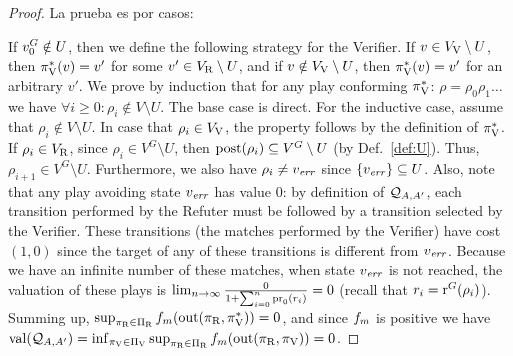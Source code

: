 \begin{proof} La prueba es por casos:
	
	If $v_0^G \notin U$, then we define the following strategy for the Verifier. If $v \in V_{\mathrm{V}} \setminus U$, then $\pi^*_{\mathrm{V}}(v)=v'$ 
	for some $v' \in V_{\mathrm{R}} \setminus U$, and if $v \notin  V_{\mathrm{V}} \setminus U$, then $\pi^*_{\mathrm{V}}(v) = v'$ for an arbitrary $v'$. 
	We prove by induction that for any play conforming $\pi^*_{\mathrm{V}}$: $\rho =\rho_0 \rho_1 \dots$ we 
have $\forall i \geq 0: \rho_i \notin V \setminus U$. The base case is direct. 
For the inductive case, assume that $\rho_i \notin V \setminus U$. In case that $\rho_i \in V_{\mathrm{V}}$, the property follows by the definition of
$\pi^*_{\mathrm{V}}$. If $\rho_i \in V_{\mathrm{R}}$, since $\rho_i \in V^G \setminus U$, then $\operatorname{post}(\rho_i) \subseteq V^G \setminus U$ (by Def.~\ref{def:U}). 
Thus, $\rho_{i+1} \in V^G \setminus U$. 
	 Furthermore, we also have $\rho_i \neq v_{\mathit{err}}$ since $\{ v_{\mathit{err}} \} \subseteq U$. Also, note that any play avoiding state $v_{\mathit{err}}$ has value $0$: by definition of $\mathcal{Q}_{A, A'}$, each transition performed by the Refuter  must be followed by a transition
selected by the Verifier. These transitions (the matches performed by the Verifier) have cost $(1,0)$ since the target of any of these transitions is different from $v_{\mathit{err}}$. Because we have an infinite number of these matches, when state $v_{\mathit{err}}$ is not reached, the valuation 
of these plays is $\lim_{n\rightarrow \infty} \frac{0}{1+ \sum^n_{i=0} \operatorname{pr}_{0}(r_i)} = 0$ (recall that $r_i = \operatorname{r}^G(\rho_i)$). 
Summing up, $\sup_{\pi_{\mathrm{R}} \in \Pi_{\mathrm{R}}} f_{m}(\operatorname{out}(\pi_{\mathrm{R}}, \pi^*_{\mathrm{V}})) = 0$, and since $f_{m}$ is positive
we have $\operatorname{val}(\mathcal{Q}_{A, A'}) = \inf_{\pi_{\mathrm{V}} \in \Pi_{\mathrm{V}}} \sup_{\pi_{\mathrm{R}} \in \Pi_{\mathrm{R}}} f_{m}(\operatorname{out}(\pi_{\mathrm{R}}, \pi_{\mathrm{V}})) = 0$.


\end{proof}
